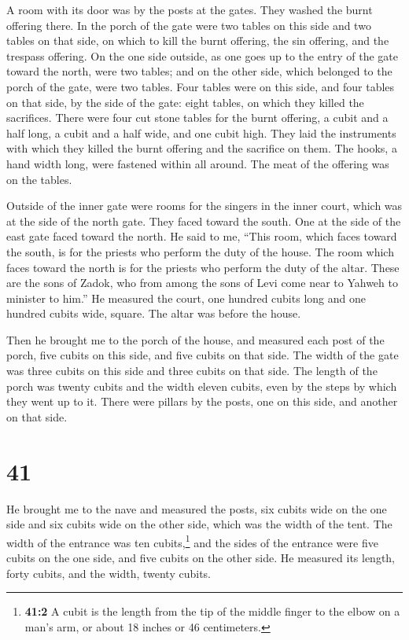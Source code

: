  A room with its door was by the posts at the gates. They
washed the burnt offering there.  In the porch of the
gate were two tables on this side and two tables on that side, on which
to kill the burnt offering, the sin offering, and the trespass offering.
 On the one side outside, as one goes up to the entry of
the gate toward the north, were two tables; and on the other side, which
belonged to the porch of the gate, were two tables.  Four
tables were on this side, and four tables on that side, by the side of
the gate: eight tables, on which they killed the sacrifices.
 There were four cut stone tables for the burnt offering,
a cubit and a half long, a cubit and a half wide, and one cubit high.
They laid the instruments with which they killed the burnt offering and
the sacrifice on them.  The hooks, a hand width long,
were fastened within all around. The meat of the offering was on the
tables.

 Outside of the inner gate were rooms for the singers in
the inner court, which was at the side of the north gate. They faced
toward the south. One at the side of the east gate faced toward the
north.  He said to me, ``This room, which faces toward
the south, is for the priests who perform the duty of the house.
 The room which faces toward the north is for the priests
who perform the duty of the altar. These are the sons of Zadok, who from
among the sons of Levi come near to Yahweh to minister to him.''
 He measured the court, one hundred cubits long and one
hundred cubits wide, square. The altar was before the house.

 Then he brought me to the porch of the house, and
measured each post of the porch, five cubits on this side, and five
cubits on that side. The width of the gate was three cubits on this side
and three cubits on that side.  The length of the porch
was twenty cubits and the width eleven cubits, even by the steps by
which they went up to it. There were pillars by the posts, one on this
side, and another on that side.

\hypertarget{section-40}{%
\section{41}\label{section-40}}

 He brought me to the nave and measured the posts, six
cubits wide on the one side and six cubits wide on the other side, which
was the width of the tent.  The width of the entrance was
ten cubits,\footnote{\textbf{41:2} A cubit is the length from the tip of
  the middle finger to the elbow on a man's arm, or about 18 inches or
  46 centimeters.} and the sides of the entrance were five cubits on the
one side, and five cubits on the other side. He measured its length,
forty cubits, and the width, twenty cubits.

